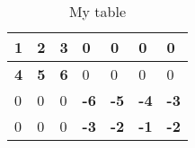 \begin{table}[htbp]
\centering
\caption{My table}
\label{My table}
\begin{tabular}{|l|l|l|l|l|l|l|}
\hline
\multicolumn{1}{|c|}{\textbf{1}} & \textbf{2} & \textbf{3} & 0 & 0 & 0 & 0 \\ \hline
\textbf{4} & \textbf{5} & \textbf{6} & 0 & 0 & 0 & 0 \\ \hline
0 & 0 & 0 & \textbf{-6} & \textbf{-5} & \textbf{-4} & \textbf{-3} \\ \hline
0 & 0 & 0 & \textbf{-3} & \textbf{-2} & \textbf{-1} & \textbf{-2} \\ \hline
\end{tabular}
\end{table}